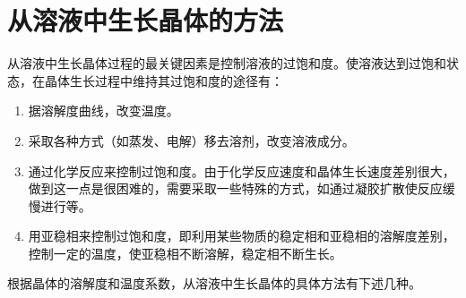 \setcounter{section}{2}
\section{从溶液中生长晶体的方法}
从溶液中生长晶体过程的最关键因素是控制溶液的过饱和度。使溶液达到过饱和状态，在晶体生长过程中维持其过饱和度的途径有：
\begin{enumerate}[(1)]
\item 据溶解度曲线，改变温度。
\item 采取各种方式（如蒸发、电解）移去溶剂，改变溶液成分。
\item 通过化学反应来控制过饱和度。由于化学反应速度和晶体生长速度差别很大，做到这一点是很困难的，需要采取一些特殊的方式，如通过凝胶扩散使反应缓慢进行等。
\item 用亚稳相来控制过饱和度，即利用某些物质的稳定相和亚稳相的溶解度差别，控制一定的温度，使亚稳相不断溶解，稳定相不断生长。
\end{enumerate}

根据晶体的溶解度和温度系数，从溶液中生长晶体的具体方法有下述几种。

